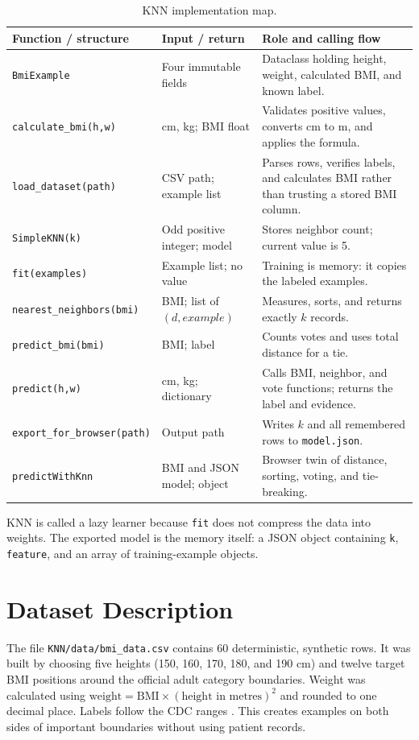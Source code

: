 \documentclass[12pt,a4paper,openany]{report}
\newcommand{\sourcepath}[1]{\texttt{#1}}
\begin{document}
\begin{table}[H]
\centering\footnotesize
\caption{KNN implementation map.}
\begin{tabularx}{\textwidth}{p{}p{}Y}
\toprule
\textbf{Function / structure} & \textbf{Input / return} & \textbf{Role and calling flow} \\
\midrule
\texttt{BmiExample} & Four immutable fields & Dataclass holding height, weight, calculated BMI, and known label. \\
\texttt{calculate\_bmi(h,w)} & cm, kg; BMI float & Validates positive values, converts cm to m, and applies the formula. \\
\texttt{load\_dataset(path)} & CSV path; example list & Parses rows, verifies labels, and calculates BMI rather than trusting a stored BMI column. \\
\texttt{SimpleKNN(k)} & Odd positive integer; model & Stores neighbor count; current value is 5. \\
\texttt{fit(examples)} & Example list; no value & Training is memory: it copies the labeled examples. \\
\texttt{nearest\_neighbors(bmi)} & BMI; list of $(d,example)$ & Measures, sorts, and returns exactly $k$ records. \\
\texttt{predict\_bmi(bmi)} & BMI; label & Counts votes and uses total distance for a tie. \\
\texttt{predict(h,w)} & cm, kg; dictionary & Calls BMI, neighbor, and vote functions; returns the label and evidence. \\
\texttt{export\_for\_browser(path)} & Output path & Writes $k$ and all remembered rows to \texttt{model.json}. \\
\texttt{predictWithKnn} & BMI and JSON model; object & Browser twin of distance, sorting, voting, and tie-breaking. \\
\bottomrule
\end{tabularx}
\end{table}

KNN is called a lazy learner because \texttt{fit} does not compress the data
into weights. The exported model is the memory itself: a JSON object containing
\texttt{k}, \texttt{feature}, and an array of training-example objects.

\section{Dataset Description}
The file \sourcepath{KNN/data/bmi\_data.csv} contains 60 deterministic,
synthetic rows. It was built by choosing five heights (150, 160, 170, 180, and
190 cm) and twelve target BMI positions around the official adult category
boundaries. Weight was calculated using
$\text{weight}=\text{BMI}\times(\text{height in metres})^2$ and rounded to one
decimal place. Labels follow the CDC ranges \cite{cdcBMI}. This creates examples
on both sides of important boundaries without using patient records.
\end{document}
